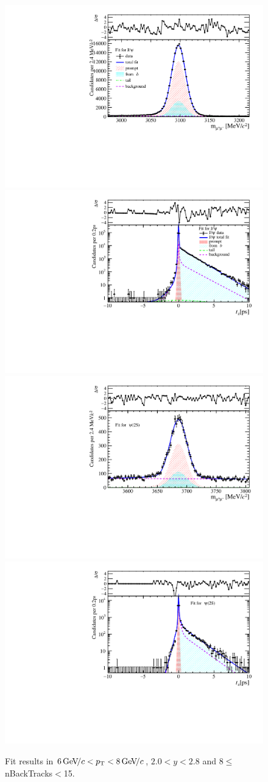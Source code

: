\begin{figure}[H]
\begin{center}
\includegraphics[width=0.47\linewidth]{pdf/Jpsi/drawmassB/n2y1pt4.pdf}
\includegraphics[width=0.47\linewidth]{pdf/Jpsi/2DFitB/n2y1pt4.pdf}
\vspace*{-0.5cm}
\includegraphics[width=0.47\linewidth]{pdf/Psi2S/drawmassB/n2y1pt4.pdf}
\includegraphics[width=0.47\linewidth]{pdf/Psi2S/2DFitB/n2y1pt4.pdf}
\vspace*{-0.5cm}
\end{center}
\caption{Fit results in $6\text{\,Ge\kern -0.1em V\!/}c<p_{\mathrm{T}}<8\text{\,Ge\kern -0.1em V\!/}c$, $2.0<y<2.8$ and 8$\leq$nBackTracks$<$15.}
\label{Fitn2y1pt4}
\end{figure}
